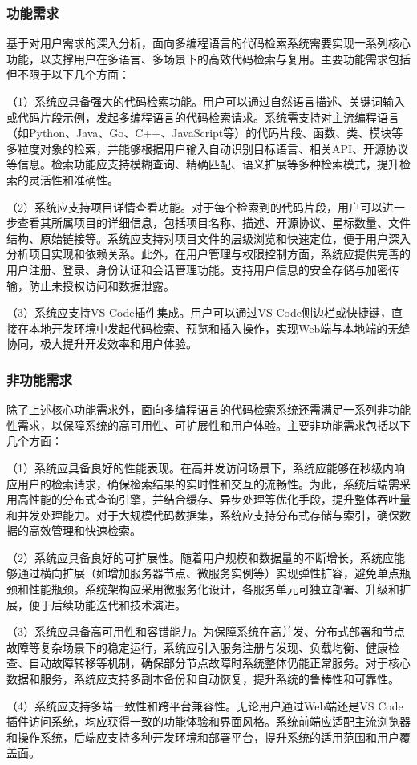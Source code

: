 \documentclass[UTF8,a4paper,12pt]{ctexart}
\numberwithin{equation}{section}
\begin{document}
\subsubsection{功能需求}
基于对用户需求的深入分析，面向多编程语言的代码检索系统需要实现一系列核心功能，以支撑用户在多语言、多场景下的高效代码检索与复用。主要功能需求包括但不限于以下几个方面：\par
（1）系统应具备强大的代码检索功能。用户可以通过自然语言描述、关键词输入或代码片段示例，发起多编程语言的代码检索请求。系统需支持对主流编程语言（如Python、Java、Go、C++、JavaScript等）的代码片段、函数、类、模块等多粒度对象的检索，并能够根据用户输入自动识别目标语言、相关API、开源协议等信息。检索功能应支持模糊查询、精确匹配、语义扩展等多种检索模式，提升检索的灵活性和准确性。\par
（2）系统应支持项目详情查看功能。对于每个检索到的代码片段，用户可以进一步查看其所属项目的详细信息，包括项目名称、描述、开源协议、星标数量、文件结构、原始链接等。系统应支持对项目文件的层级浏览和快速定位，便于用户深入分析项目实现和依赖关系。此外，在用户管理与权限控制方面，系统应提供完善的用户注册、登录、身份认证和会话管理功能。支持用户信息的安全存储与加密传输，防止未授权访问和数据泄露。\par
（3）系统应支持VS Code插件集成。用户可以通过VS Code侧边栏或快捷键，直接在本地开发环境中发起代码检索、预览和插入操作，实现Web端与本地端的无缝协同，极大提升开发效率和用户体验。\par
\subsubsection{非功能需求}
除了上述核心功能需求外，面向多编程语言的代码检索系统还需满足一系列非功能性需求，以保障系统的高可用性、可扩展性和用户体验。主要非功能需求包括以下几个方面：\par
（1）系统应具备良好的性能表现。在高并发访问场景下，系统应能够在秒级内响应用户的检索请求，确保检索结果的实时性和交互的流畅性。为此，系统后端需采用高性能的分布式查询引擎，并结合缓存、异步处理等优化手段，提升整体吞吐量和并发处理能力。对于大规模代码数据集，系统应支持分布式存储与索引，确保数据的高效管理和快速检索。\par
（2）系统应具备良好的可扩展性。随着用户规模和数据量的不断增长，系统应能够通过横向扩展（如增加服务器节点、微服务实例等）实现弹性扩容，避免单点瓶颈和性能瓶颈。系统架构应采用微服务化设计，各服务单元可独立部署、升级和扩展，便于后续功能迭代和技术演进。\par
（3）系统应具备高可用性和容错能力。为保障系统在高并发、分布式部署和节点故障等复杂场景下的稳定运行，系统应引入服务注册与发现、负载均衡、健康检查、自动故障转移等机制，确保部分节点故障时系统整体仍能正常服务。对于核心数据和服务，系统应支持多副本备份和自动恢复，提升系统的鲁棒性和可靠性。\par
（4）系统应支持多端一致性和跨平台兼容性。无论用户通过Web端还是VS Code插件访问系统，均应获得一致的功能体验和界面风格。系统前端应适配主流浏览器和操作系统，后端应支持多种开发环境和部署平台，提升系统的适用范围和用户覆盖面。\par
\end{document}
